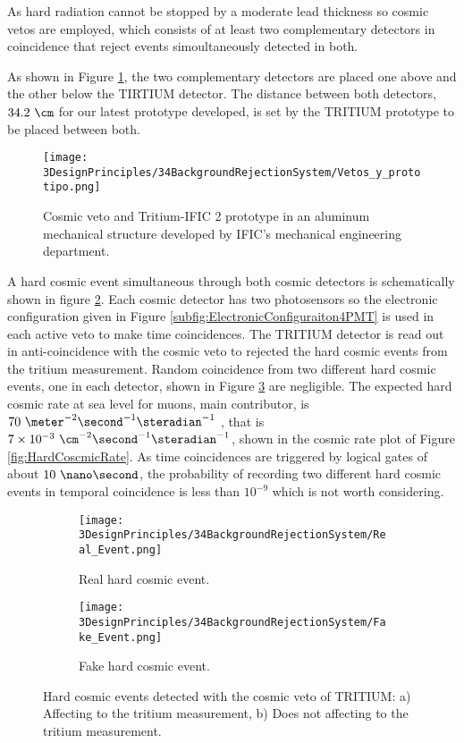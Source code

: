 As hard radiation cannot be stopped by a moderate lead thickness so cosmic vetos are employed, which consists of at least two complementary detectors in coincidence that reject events simoultaneously detected in both. 

As shown in Figure \ref{fig:VetoAndPrototype}, the two complementary detectors are placed one above and the other below the TIRTIUM detector. The distance between both detectors, $34.2~\cm$ for our latest prototype developed, is set by the TRITIUM prototype to be placed between both.

\begin{figure}[h]
\centering
\texttt{[image: 3DesignPrinciples/34BackgroundRejectionSystem/Vetos\_y\_prototipo.png]}
\caption{Cosmic veto and Tritium-IFIC 2 prototype in an aluminum mechanical structure developed by IFIC's mechanical engineering department.\label{fig:VetoAndPrototype}}
\end{figure}

A hard cosmic event simultaneous through both cosmic detectors is schematically shown in figure \ref{subfig:RealHardCosmicEvent}. Each cosmic detector has two photosensors so the electronic configuration given in Figure \ref{subfig:ElectronicConfiguraiton4PMT} is used in each active veto to make time coincidences. The TRITIUM detector is read out in anti-coincidence with the cosmic veto to rejected the hard cosmic events from the tritium measurement. Random coincidence from two different hard cosmic events, one in each detector, shown in Figure \ref{subfig:FakeHardCosmicEvent} are negligible. The expected hard cosmic rate at sea level for muons, main contributor, is $70~\meter^{-2}\second^{-1}\steradian^{-1}$ \cite{PDG, HardCosmicMuonRate}, that is $7\times 10^{-3}~\cm^{-2}\second^{-1}\steradian^{-1}$, shown in the cosmic rate plot of Figure \ref{fig:HardCoscmicRate}. As time coincidences are triggered by logical gates of about $10~\nano\second$, the probability of recording two different hard cosmic events in temporal coincidence is less than $10^{-9}$ which is not worth considering.

\begin{figure}
\centering
    \begin{subfigure}[b]{0.45\textwidth}
    \centering
    \texttt{[image: 3DesignPrinciples/34BackgroundRejectionSystem/Real\_Event.png]}  
    \caption{Real hard cosmic event.\label{subfig:RealHardCosmicEvent}}
    \end{subfigure}
    \hfill
    \begin{subfigure}[b]{0.45\textwidth}
    \centering
    \texttt{[image: 3DesignPrinciples/34BackgroundRejectionSystem/Fake\_Event.png]}  
    \caption{Fake hard cosmic event.\label{subfig:FakeHardCosmicEvent}}
    \end{subfigure}
   \caption{Hard cosmic events detected with the cosmic veto of TRITIUM: a) Affecting to the tritium measurement, b) Does not affecting to the tritium measurement.}
 \label{fig:HardCosmicEventsSimulation}
\end{figure}

